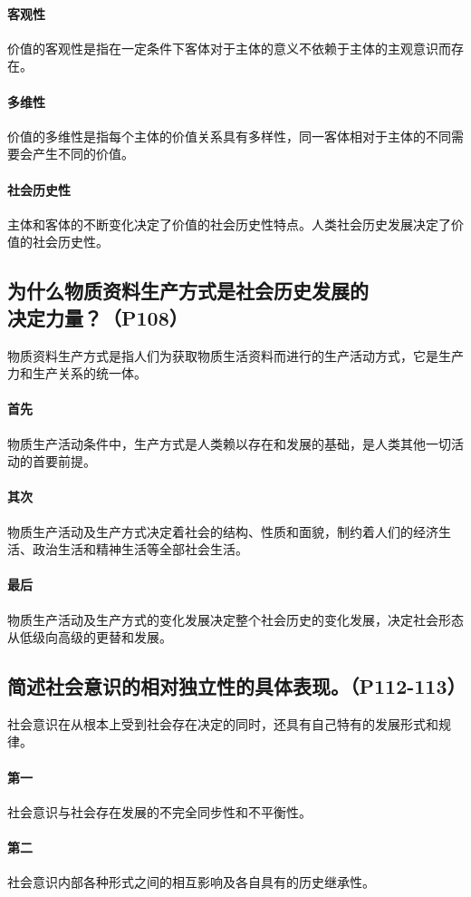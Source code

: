 \documentclass[UTF8]{ctexart}
\begin{document}
			\paragraph{客观性}
				价值的客观性是指在一定条件下客体对于主体的意义不依赖于主体的主观意识而存在。
			\paragraph{多维性}
				价值的多维性是指每个主体的价值关系具有多样性，同一客体相对于主体的不同需要会产生不同的价值。
			\paragraph{社会历史性}
				主体和客体的不断变化决定了价值的社会历史性特点。人类社会历史发展决定了价值的社会历史性。
		\subsection{为什么物质资料生产方式是社会历史发展的\\决定力量？（P108）}
			物质资料生产方式是指人们为获取物质生活资料而进行的生产活动方式，它是生产力和生产关系的统一体。
			\paragraph{首先}
				物质生产活动条件中，生产方式是人类赖以存在和发展的基础，是人类其他一切活动的首要前提。
			\paragraph{其次}
				物质生产活动及生产方式决定着社会的结构、性质和面貌，制约着人们的经济生活、政治生活和精神生活等全部社会生活。
			\paragraph{最后}
				物质生产活动及生产方式的变化发展决定整个社会历史的变化发展，决定社会形态从低级向高级的更替和发展。
		\subsection{简述社会意识的相对独立性的具体表现。（P112-113）}
			社会意识在从根本上受到社会存在决定的同时，还具有自己特有的发展形式和规律。
			\paragraph{第一}
				社会意识与社会存在发展的不完全同步性和不平衡性。
			\paragraph{第二}
				社会意识内部各种形式之间的相互影响及各自具有的历史继承性。
\end{document}
